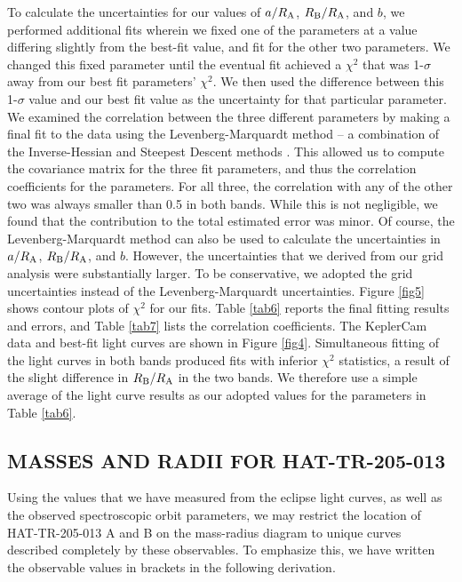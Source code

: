 \documentclass[12pt, preprint]{aastex}
\begin{document}
To calculate the uncertainties for our values of $a/R_{\rm A}$, $R_{\rm B}/R_{\rm A}$, and $b$, we performed additional fits wherein we fixed one of the parameters at a value differing slightly from the best-fit value, and fit for the other two parameters. We changed this fixed parameter until the eventual fit achieved a $\chi^2$ that was 1-$\sigma$ away from our best fit parameters' $\chi^2$. We then used the difference between this 1-$\sigma$ value and our best fit value as the uncertainty for that particular parameter. We examined the correlation between the three different parameters by making a final fit to the data using the Levenberg-Marquardt method -- a combination of the Inverse-Hessian and Steepest Descent methods \citep{press1992}. This allowed us to compute the covariance matrix for the three fit parameters, and thus the correlation coefficients for the parameters. For all three, the correlation with any of the other two was always smaller than 0.5 in both bands. While this is not negligible, we found that the contribution to the total estimated error was minor. Of course, the Levenberg-Marquardt method can also be used to calculate the uncertainties in $a/R_{\rm A}$, $R_{\rm B}/R_{\rm A}$, and $b$. However, the uncertainties that we derived from our grid analysis were substantially larger. To be conservative, we adopted the grid uncertainties instead of the Levenberg-Marquardt uncertainties. Figure \ref{fig5} shows contour plots of $\chi^2$ for our fits. Table \ref{tab6} reports the final fitting results and errors, and Table \ref{tab7} lists the correlation coefficients. The KeplerCam data and best-fit light curves are shown in Figure \ref{fig4}. Simultaneous fitting of the light curves in both bands produced fits with inferior $\chi^2$ statistics, a result of the slight difference in $R_{\rm B}/R_{\rm A}$ in the two bands. We therefore use a simple average of the light curve results as our adopted values for the parameters in Table \ref{tab6}.

\subsection{MASSES AND RADII FOR HAT-TR-205-013}

Using the values that we have measured from the eclipse light curves,
as well as the observed spectroscopic orbit parameters, we may
restrict the location of HAT-TR-205-013 A and B on the mass-radius diagram to unique curves described
completely by these observables. To emphasize this, we have written
the observable values in brackets in the following derivation.
\end{document}
